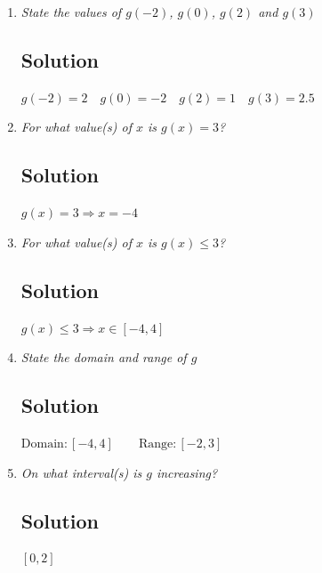 \documentclass[11pt]{article}
\begin{document}
\begin{enumerate}
	\item \textit{State the values of $g(-2)$, $g(0)$, $g(2)$ and $g(3)$}
	\subsection*{Solution}
	$g(-2)=2 \quad g(0)=-2 \quad g(2)=1 \quad g(3)=2.5$
	
	\item \textit{For what value(s) of $x$ is $g(x)=3$?}
	\subsection*{Solution}
	$g(x)=3 \Rightarrow x=-4$
	
	\item \textit{For what value(s) of $x$ is $g(x) \leq 3$?}
	\subsection*{Solution}
	$g(x) \leq 3 \Rightarrow x \in [-4,4]$
	
	\item \textit{State the domain and range of $g$}
	\subsection*{Solution}
	$\mathrm{Domain}:[-4,4] \qquad\mathrm{Range}:[-2,3]$
	
	\item \textit{On what interval(s) is $g$ increasing?}
	\subsection*{Solution}
	$[0,2]$
\end{enumerate}
\end{document}
